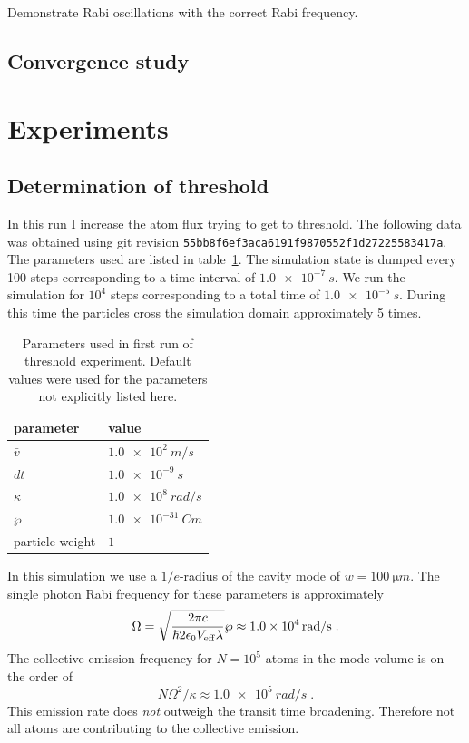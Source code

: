 \documentclass[aps, superscriptaddress, groupedaddress, preprint]{revtex4}
\newcommand\gitrevision[1]{{\tt #1}}
\begin{document}
Demonstrate Rabi oscillations with the correct Rabi frequency.


\subsection{Convergence study}


\section{Experiments}


\subsection{Determination of threshold}

In this run I increase the atom flux trying to get to threshold.
The following data was obtained using git revision
\gitrevision{55bb8f6ef3aca6191f9870552f1d27225583417a}.  The
parameters used are listed in table~\ref{tab:Run1Params}.  The
simulation state is dumped every 100 steps corresponding to a
time interval of $\SI{1.0e-7}{s}$.  We run the simulation for
$10^4$ steps corresponding to a total time of $\SI{1.0e-5}{s}$.
During this time the particles cross the simulation domain
approximately 5 times.

\begin{table}
  \begin{tabular}{|l|l|}
    \hline
    parameter       & value\\
    \hline
    \hline
    $\bar v$        & $\SI{1.0e2}{m/s}$\\
    \hline
    $dt$            & $\SI{1.0e-9}{s}$\\
    \hline
    $\kappa$        & $\SI{1.0e8}{rad/s}$\\
    \hline
    $\wp$           & $\SI{1.0e-31}{Cm}$\\
    \hline
    particle weight & $1$\\
    \hline
  \end{tabular}
  \caption{Parameters used in first run of threshold experiment.
    Default values were used for the parameters not explicitly
    listed here.}
  \label{tab:Run1Params}
\end{table}

In this simulation we use a $1/e$-radius of the cavity mode of
$w=\SI{100}{\micro m}$.  The single photon Rabi frequency for
these parameters is approximately
\begin{equation}
  \Omega =
  \sqrt{\frac{2\pi c}{\hbar 2 \epsilon_0 V_{\rm eff}\lambda}} \wp \approx
  \SI{1.0e4}{rad/s}\;.
\end{equation}
The collective emission frequency for $N=10^5$ atoms in the mode
volume is on the order of
\begin{equation}
  N\Omega^2/\kappa \approx \SI{1.0e5}{rad/s}\;.
\end{equation}
This emission rate does \emph{not} outweigh the transit time
broadening.  Therefore not all atoms are contributing to the
collective emission.
\end{document}
